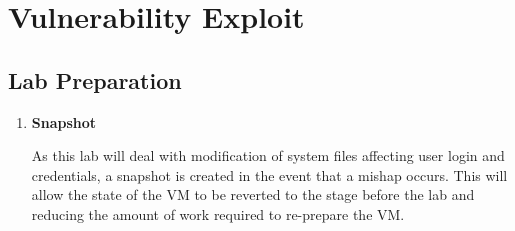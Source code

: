 \documentclass[a4paper,12pt]{article}
\begin{document}
\section{Vulnerability Exploit}
\subsection{Lab Preparation}\vspace{1em}
\begin{enumerate}
\item \textbf{Snapshot}\begin{par}
	As this lab will deal with modification of system files affecting user login and credentials, a snapshot is created in the event that a mishap occurs. This will allow the state of the VM to be reverted to the stage before the lab and reducing the amount of work required to re-prepare the VM.\end{par}
\end{enumerate}
\newpage
\end{document}
